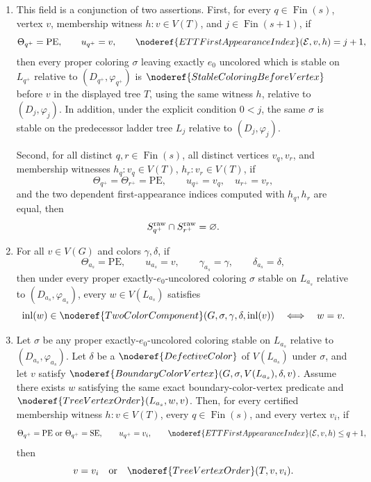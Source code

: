 \begin{definition}
\begin{enumerate}
\item[\texttt{lowerThree}.]
This field is a conjunction of two assertions.  First, for every
\(q\in\operatorname{Fin}(s)\), vertex \(v\), membership witness
\(h:v\in V(T)\), and \(j\in\operatorname{Fin}(s+1)\), if
\[
 \Theta_{q^+}=\mathrm{PE},\qquad u_{q^+}=v,\qquad
 \noderef{ETTFirstAppearanceIndex}(\mathcal E,v,h)=j+1,
\]
then every proper coloring \(\sigma\) leaving exactly \(e_0\) uncolored
which is stable on \(L_{q^+}\) relative to
\((D_{q^+},\varphi_{q^+})\) is
\(\noderef{StableColoringBeforeVertex}\) before \(v\) in the displayed
tree \(T\), using the same witness \(h\), relative to
\((D_j,\varphi_j)\).  In addition, under the explicit condition \(0<j\),
the same \(\sigma\) is stable on the predecessor ladder tree \(L_j\)
relative to \((D_j,\varphi_j)\).

Second, for all distinct \(q,r\in\operatorname{Fin}(s)\), all distinct
vertices \(v_q,v_r\), and membership witnesses
\(h_q:v_q\in V(T)\), \(h_r:v_r\in V(T)\), if
\[
 \Theta_{q^+}=\Theta_{r^+}=\mathrm{PE},\qquad
 u_{q^+}=v_q,\quad u_{r^+}=v_r,
\]
and the two dependent first-appearance indices computed with \(h_q,h_r\)
are equal, then
\[
  S_{q^+}^{\rm raw}\cap S_{r^+}^{\rm raw}=\varnothing.
\]

\item[\texttt{lowerFour}.]
For all \(v\in V(G)\) and colors \(\gamma,\delta\), if
\[
 \Theta_{a_s}=\mathrm{PE},\qquad u_{a_s}=v,\qquad
 \gamma_{a_s}=\gamma,\qquad\delta_{a_s}=\delta,
\]
then under every proper exactly-\(e_0\)-uncolored coloring \(\sigma\)
stable on \(L_{a_s}\) relative to
\((D_{a_s},\varphi_{a_s})\), every \(w\in V(L_{a_s})\) satisfies
\[
 \operatorname{inl}(w)\in
   \noderef{TwoColorComponent}(G,\sigma,\gamma,\delta,
      \operatorname{inl}(v))
 \quad\Longleftrightarrow\quad w=v.
\]

\item[\texttt{lowerFive}.]
Let \(\sigma\) be any proper exactly-\(e_0\)-uncolored coloring stable on
\(L_{a_s}\) relative to \((D_{a_s},\varphi_{a_s})\).  Let \(\delta\) be a
\(\noderef{DefectiveColor}\) of \(V(L_{a_s})\) under \(\sigma\), and let
\(v\) satisfy
\(\noderef{BoundaryColorVertex}(G,\sigma,V(L_{a_s}),\delta,v)\).
Assume there exists \(w\) satisfying the same exact boundary-color-vertex
predicate and
\(\noderef{TreeVertexOrder}(L_{a_s},w,v)\).  Then, for every certified
membership witness \(h:v\in V(T)\), every
\(q\in\operatorname{Fin}(s)\), and every vertex \(v_i\), if
\[
 \Theta_{q^+}=\mathrm{PE}\ \hbox{or}\
 \Theta_{q^+}=\mathrm{SE},\qquad
 u_{q^+}=v_i,\qquad
 \noderef{ETTFirstAppearanceIndex}(\mathcal E,v,h)\leq q+1,
\]
then
\[
 v=v_i\quad\hbox{or}\quad\noderef{TreeVertexOrder}(T,v,v_i).
\]


\end{enumerate}
\end{definition}
